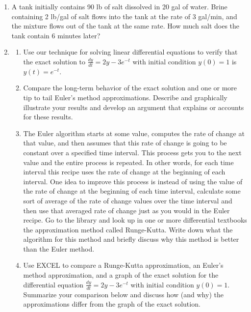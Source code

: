 \begin{enumerate}[resume]
\begin{enumerate}
\item	A tank initially contains 90 lb of salt dissolved in 20 gal of water. Brine containing 2 lb/gal of salt flows into the tank at the rate of 3 gal/min, and the mixture flows out of the tank at the same rate. How much salt does the tank contain 6 minutes later? \label{06HWproblem5}
\vfill

\clearpage

\item \label{06HWproblem6}
\begin{enumerate}
\item Use our technique for solving linear differential equations to verify that the exact solution to $\displaystyle\frac{dy}{dt}=2y-3e^{-t}$ with initial condition $y(0) = 1$ is $y(t) = e^{-t}$.

\item	Compare the long-term behavior of the exact solution and one or more tip to tail Euler's method approximations. Describe and graphically illustrate your results and develop an argument that explains or accounts for these results.

\item The Euler algorithm starts at some value, computes the rate of change at that value, and then assumes that this rate of change is going to be constant over a specified time interval. This process gets you to the next value and the entire process is repeated. In other words, for each time interval this recipe uses the rate of change at the beginning of each interval. One idea to improve this process is instead of using the value of the rate of change at the beginning of each time interval, calculate some sort of average of the rate of change values over the time interval and then use that averaged rate of change just as you would in the Euler recipe. Go to the library and look up in one or more differential textbooks the approximation method called Runge-Kutta. Write down what the algorithm for this method and briefly discuss why this method is better than the Euler method. 

\item	Use EXCEL to compare a Runge-Kutta approximation, an Euler's method approximation, and a graph of the exact solution for the differential equation $\displaystyle\frac{dy}{dt}=2y-3e^{-t}$ with initial condition $y(0) = 1$. Summarize your comparison below and discuss how (and why) the approximations differ from the graph of the exact solution.
\end{enumerate}


\end{enumerate}
\end{enumerate}
